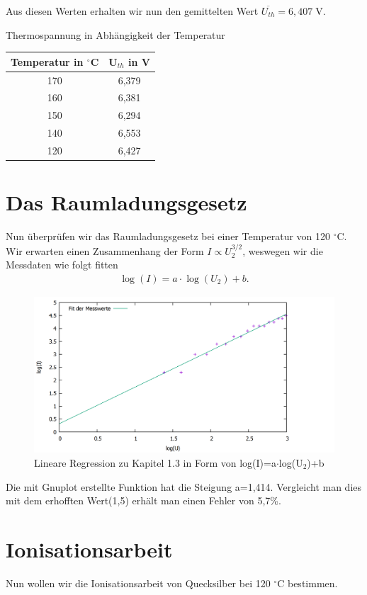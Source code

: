 Aus diesen Werten erhalten wir nun den gemittelten Wert $ \overline{U_{th}} =6,407\; $V.
\begin{tabel}
	\centering
	\caption {Thermospannung in Abhängigkeit der Temperatur}
	\begin{tabular}{|c|c|}
		\hline
		Temperatur in $^\circ$C & U$_{th}$ in V \\ \hline
		170           &     6,379     \\ \hline
		160           &     6,381     \\ \hline
		150           &     6,294     \\ \hline
		140           &     6,553     \\ \hline
		120           &     6,427     \\ \hline
	\end{tabular} 
\end{tabel}
\section{Das Raumladungsgesetz}
Nun überprüfen wir das Raumladungsgesetz bei einer Temperatur von 120 $ ^\circ $C. Wir erwarten einen Zusammenhang der Form $I\propto U_{2}^{3/2}  $, weswegen wir die Messdaten wie folgt fitten
\begin{align*}
\log(I)=a\cdot \log(U_{2})+b\text{.}
\end{align*}
\begin{figure}
	\includegraphics[width=\textwidth]{../Daten/Aufgabe1/Aufgabe1_3.png}
	\caption{Lineare Regression zu Kapitel 1.3 in Form von log(I)=a$ \cdot $log(U$ _2 $)+b}
\end{figure}
Die mit Gnuplot erstellte Funktion hat die Steigung a=1,414. Vergleicht man dies mit dem erhofften Wert(1,5) erhält man einen Fehler von 5,7\%.

\section{Ionisationsarbeit}
Nun wollen wir die Ionisationsarbeit von Quecksilber bei 120 $ ^\circ $C bestimmen.
